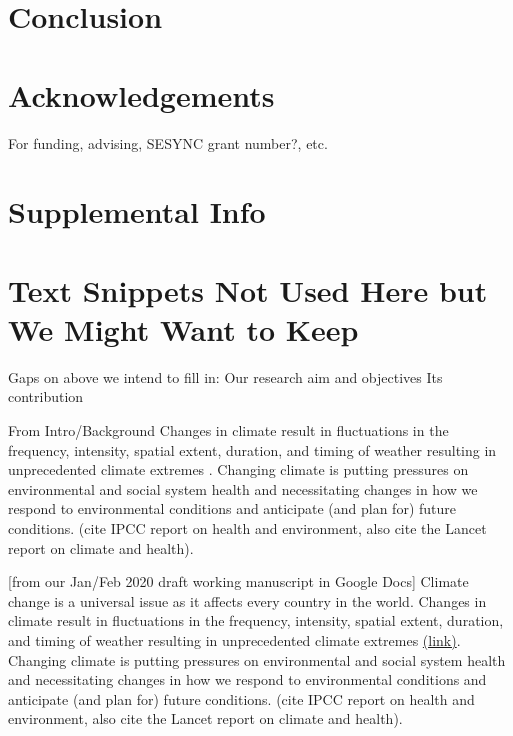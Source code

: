 \documentclass{article}
\begin{document}
\section{Conclusion}

\section{Acknowledgements}
For funding, advising, SESYNC grant number?, etc.

\printbibliography

\section*{Supplemental Info}
\setcounter{table}{0}
\setcounter{figure}{0}
\setcounter{section}{0}
\renewcommand{\thetable}{S\arabic{table}}
\renewcommand{\thefigure}{S\arabic{figure}}
\renewcommand{\thesection}{S\arabic{section}}

\section*{Text Snippets Not Used Here but We Might Want to Keep}
Gaps on above we intend to fill in:
Our research aim and objectives
Its contribution

From Intro/Background
Changes in climate result in fluctuations in the frequency, intensity, spatial extent, duration, and timing of weather resulting in unprecedented climate extremes . Changing climate is putting pressures on environmental and social system health and necessitating changes in how we respond to environmental conditions and anticipate (and plan for) future conditions. (cite IPCC report on health and environment, also cite the Lancet report on climate and health). 

[from our Jan/Feb 2020 draft working manuscript in Google Docs]
Climate change is a universal issue as it affects every country in the world. Changes in climate result in fluctuations in the frequency, intensity, spatial extent, duration, and timing of weather resulting in unprecedented climate extremes \href{https://www.ipcc.ch/site/assets/uploads/2018/03/SREX-Chap3_FINAL-1.pdf}{(link)}. Changing climate is putting pressures on environmental and social system health and necessitating changes in how we respond to environmental conditions and anticipate (and plan for) future conditions. (cite IPCC report on health and environment, also cite the Lancet report on climate and health).
\end{document}
